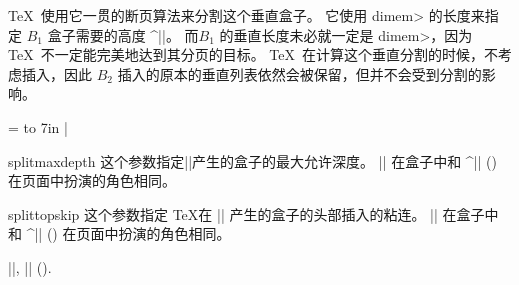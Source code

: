 \TeX\ 使用它一贯的断页算法来分割这个垂直盒子。
它使用 \<dimem> 的长度来指定 $B_1$ 盒子需要的高度 ^|\pagegoal|。
而$B_1$ 的垂直长度未必就一定是 \<dimem>，因为 \TeX\ 不一定能完美地达到其分页的目标。
\TeX\ 在计算这个垂直分割的时候，不考虑插入，因此 $B_2$ 插入的原本的垂直列表依然会被保留，但并不会受到分割的影响。



\example
{} =  to 7in
|
\endexample
\enddesc



\begindesc
\cts splitmaxdepth {}
\explain
这个参数指定|\vsplit|产生的盒子的最大允许深度。
|\splitmaxdepth| 在盒子中和 ^|\maxdepth| (\xref \maxdepth) 在页面中扮演的角色相同。
\enddesc



\begindesc
\cts splittopskip {}
\explain
这个参数指定 \TeX 在 |\vsplit| 产生的盒子的头部插入的粘连。
|\splittopskip| 在盒子中和 ^|\topskip| (\xref \topskip) 在页面中扮演的角色相同。
\enddesc



\see |\splitbotmark|, |\splitfirstmark| (\xref \splitfirstmark).

\enddescriptions \endchapter \byebye
